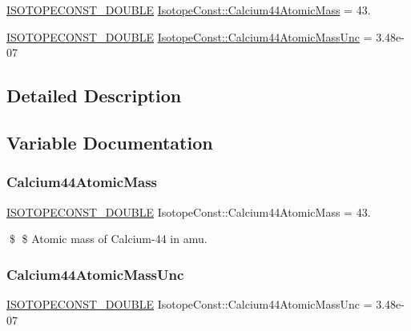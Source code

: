 \begin{DoxyCompactItemize}
\item 
\mbox{\hyperlink{group___isotope_const-_macros_ga8f45a7272ce02c0b4c65c44636ed719a}{I\+S\+O\+T\+O\+P\+E\+C\+O\+N\+S\+T\+\_\+\+D\+O\+U\+B\+LE}} \mbox{\hyperlink{group___isotope_const-_calcium-_ca44_ga625c4281e7e240869ce11be911c3ad4b}{Isotope\+Const\+::\+Calcium44\+Atomic\+Mass}} = 43.
\item 
\mbox{\hyperlink{group___isotope_const-_macros_ga8f45a7272ce02c0b4c65c44636ed719a}{I\+S\+O\+T\+O\+P\+E\+C\+O\+N\+S\+T\+\_\+\+D\+O\+U\+B\+LE}} \mbox{\hyperlink{group___isotope_const-_calcium-_ca44_gaf93221ff944cbd51484ae0e0670b3803}{Isotope\+Const\+::\+Calcium44\+Atomic\+Mass\+Unc}} = 3.\+48e-\/07
\end{DoxyCompactItemize}


\subsection{Detailed Description}


\subsection{Variable Documentation}
\mbox{\label{group___isotope_const-_calcium-_ca44_ga625c4281e7e240869ce11be911c3ad4b}} 
\subsubsection{\texorpdfstring{Calcium44\+Atomic\+Mass}{Calcium44AtomicMass}}
{\footnotesize\ttfamily \mbox{\hyperlink{group___isotope_const-_macros_ga8f45a7272ce02c0b4c65c44636ed719a}{I\+S\+O\+T\+O\+P\+E\+C\+O\+N\+S\+T\+\_\+\+D\+O\+U\+B\+LE}} Isotope\+Const\+::\+Calcium44\+Atomic\+Mass = 43.}

\$ \$ Atomic mass of Calcium-\/44 in amu. \mbox{\label{group___isotope_const-_calcium-_ca44_gaf93221ff944cbd51484ae0e0670b3803}} 
\subsubsection{\texorpdfstring{Calcium44\+Atomic\+Mass\+Unc}{Calcium44AtomicMassUnc}}
{\footnotesize\ttfamily \mbox{\hyperlink{group___isotope_const-_macros_ga8f45a7272ce02c0b4c65c44636ed719a}{I\+S\+O\+T\+O\+P\+E\+C\+O\+N\+S\+T\+\_\+\+D\+O\+U\+B\+LE}} Isotope\+Const\+::\+Calcium44\+Atomic\+Mass\+Unc = 3.\+48e-\/07}

